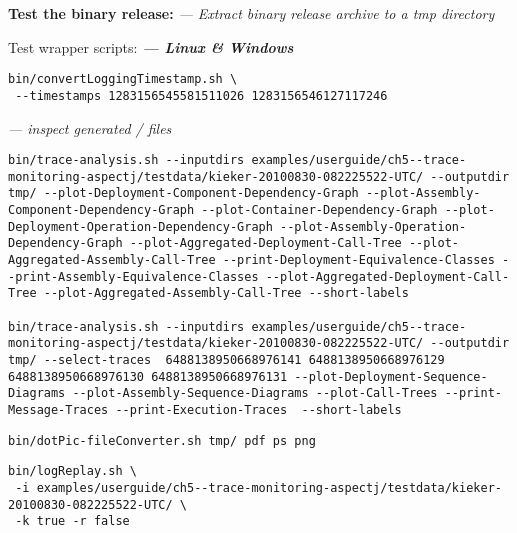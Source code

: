 \begin{compactenum}
\item \textbf{Test the binary release:} \textit{--- Extract binary release archive to a tmp directory}
\begin{compactenum}
\item Test wrapper scripts: \textbf{\textit{--- Linux \& Windows}}
\begin{compactitem}
\item {} 
\setBashListing
\begin{lstlisting}
bin/convertLoggingTimestamp.sh \
 --timestamps 1283156545581511026 1283156546127117246
\end{lstlisting}
\item {} \textit{--- inspect generated / files}
\setBashListing
\begin{lstlisting}
bin/trace-analysis.sh --inputdirs examples/userguide/ch5--trace-monitoring-aspectj/testdata/kieker-20100830-082225522-UTC/ --outputdir tmp/ --plot-Deployment-Component-Dependency-Graph --plot-Assembly-Component-Dependency-Graph --plot-Container-Dependency-Graph --plot-Deployment-Operation-Dependency-Graph --plot-Assembly-Operation-Dependency-Graph --plot-Aggregated-Deployment-Call-Tree --plot-Aggregated-Assembly-Call-Tree --print-Deployment-Equivalence-Classes --print-Assembly-Equivalence-Classes --plot-Aggregated-Deployment-Call-Tree --plot-Aggregated-Assembly-Call-Tree --short-labels

bin/trace-analysis.sh --inputdirs examples/userguide/ch5--trace-monitoring-aspectj/testdata/kieker-20100830-082225522-UTC/ --outputdir tmp/ --select-traces  6488138950668976141 6488138950668976129 6488138950668976130 6488138950668976131 --plot-Deployment-Sequence-Diagrams --plot-Assembly-Sequence-Diagrams --plot-Call-Trees --print-Message-Traces --print-Execution-Traces  --short-labels
\end{lstlisting}

% 
\item {}
\setBashListing
\begin{lstlisting}
bin/dotPic-fileConverter.sh tmp/ pdf ps png
\end{lstlisting}
\item {}
\setBashListing
\begin{lstlisting}
bin/logReplay.sh \
 -i examples/userguide/ch5--trace-monitoring-aspectj/testdata/kieker-20100830-082225522-UTC/ \
 -k true -r false


\end{lstlisting}
\end{compactitem}
\end{compactenum}
\end{compactenum}
